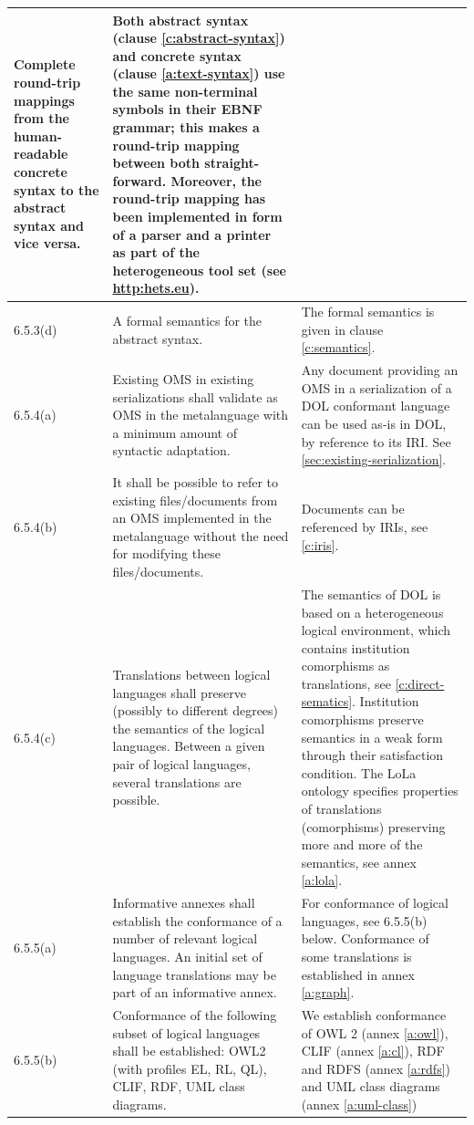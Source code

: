\documentclass[10pt,fleqn,%
\ifpretendfinal
final%
\else
draft%
\fi,
]{scrreprt}
\begin{document}
\begin{center}
\begin{longtable}{|p{}|p{}|p{}|}
Complete round-trip mappings from the human-readable concrete syntax to the abstract syntax and
vice versa.	&
Both abstract syntax (clause \ref{c:abstract-syntax}) and concrete syntax (clause 
\ref{a:text-syntax}) use the same non-terminal symbols
in their EBNF grammar; this makes a round-trip mapping between both straight-forward. Moreover, the 
round-trip mapping has been implemented in form of a parser and a printer as part of the 
heterogeneous tool set (see \url{http:hets.eu}).
   \\ \hline
%
6.5.3(d)& 
A formal semantics for the abstract syntax.	&
The formal semantics is given in clause \ref{c:semantics}.
   \\ \hline
%
%
6.5.4(a)& 
Existing OMS in existing serializations shall validate as OMS in the metalanguage with a minimum
amount of syntactic adaptation.	& 
Any document providing an OMS in a serialization of a DOL conformant
language can be used as-is in DOL, by reference to its IRI.
See \ref{sec:existing-serialization}.
   \\ \hline
%
6.5.4(b)& 
It shall be possible to refer to existing files/documents from an OMS implemented in the
metalanguage without the need for modifying these files/documents.	&
Documents can be referenced by IRIs, see \ref{c:iris}.
   \\ \hline
%
6.5.4(c)& 
Translations between logical languages shall preserve (possibly to different degrees) the semantics
of the logical languages. Between a given pair of logical languages, several translations are
possible.	&
The semantics of DOL is based on a heterogeneous logical
environment, which contains institution comorphisms as translations, see \ref{c:direct-sematics}. 
Institution comorphisms preserve semantics
in a weak form through their satisfaction condition. The LoLa ontology specifies properties of 
translations (comorphisms) preserving more and more of the semantics, see annex 
\ref{a:lola}.
   \\ \hline
%
6.5.5(a)& 
Informative annexes shall establish the conformance of a number of relevant logical languages. An
initial set of language translations may be part of an informative annex.	&
For conformance of logical languages, see 6.5.5(b) below.
Conformance of some translations is established in annex \ref{a:graph}.
   \\ \hline
%
6.5.5(b)& 
Conformance of the following subset of logical languages  shall be established: OWL2 (with profiles
EL, RL, QL), CLIF, RDF, UML class diagrams.
	&
We establish conformance of OWL 2 (annex \ref{a:owl}), CLIF (annex \ref{a:cl}), RDF and RDFS (annex \ref{a:rdfs}) and UML class diagrams (annex \ref{a:uml-class}) 

\end{longtable}
\end{center}
\end{document}

